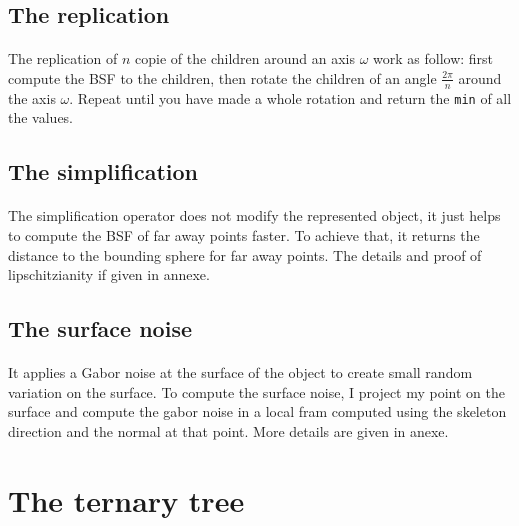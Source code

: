\documentclass[a4paper,12pt]{article}
\begin{document}
\subsection*{The replication}

\paragraph{} The replication of $n$ copie of the children around an axis $\omega$ work as follow:
 first compute the BSF to the children, then rotate the children of an angle $\frac{2\pi}{n}$ around the axis $\omega$. Repeat until you have made a whole rotation and return the \texttt{min} of all the values.


\subsection*{The simplification}

\paragraph{} The simplification operator does not modify the represented object, it just helps to compute the BSF of far away points faster. To achieve that, it returns the distance to the bounding sphere for far away points. The details and proof of lipschitzianity if given in annexe.


\subsection*{The surface noise\cite{zanni2013modelisation}}

\paragraph{} It applies a Gabor noise\cite{lagae2009procedural} at the surface of the object to create small random variation on the surface. To compute the surface noise, I project my point on the surface and compute the gabor noise in a local fram computed using the skeleton direction and the normal at that point. More details are given in anexe.


\newpage
\section*{The ternary tree}

\end{document}
